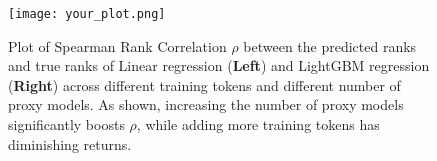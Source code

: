 \begin{figure}[h]
    \centering
    \texttt{[image: your\_plot.png]}
    \caption{Plot of Spearman Rank Correlation $\rho$ between the predicted ranks and true ranks of Linear regression (\textbf{Left}) and LightGBM regression (\textbf{Right}) across different training tokens and different number of proxy models. As shown, increasing the number of proxy models significantly boosts $\rho$, while adding more training tokens has diminishing returns.}
    \label{fig:spearman_correlation}
\end{figure}